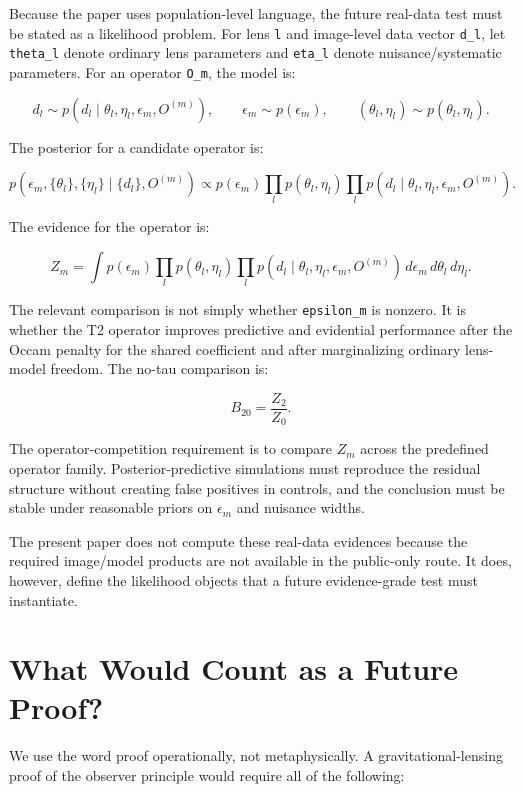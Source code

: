 \documentclass[11pt]{article}
\begin{document}
Because the paper uses population-level language, the future real-data
test must be stated as a likelihood problem. For lens \texttt{l} and
image-level data vector \texttt{d\_l}, let \texttt{theta\_l} denote
ordinary lens parameters and \texttt{eta\_l} denote nuisance/systematic
parameters. For an operator \texttt{O\_m}, the model is:

\[
d_l \sim
p\!\left(d_l \mid \theta_l,\eta_l,\epsilon_m,O^{(m)}\right),
\qquad
\epsilon_m \sim p(\epsilon_m),
\qquad
(\theta_l,\eta_l) \sim p(\theta_l,\eta_l).
\]

The posterior for a candidate operator is:

\[
p\!\left(
\epsilon_m,\{\theta_l\},\{\eta_l\}
\mid
\{d_l\},O^{(m)}
\right)
\propto
p(\epsilon_m)
\prod_l p(\theta_l,\eta_l)
\prod_l
p\!\left(d_l\mid\theta_l,\eta_l,\epsilon_m,O^{(m)}\right).
\]

The evidence for the operator is:

\[
Z_m =
\int
p(\epsilon_m)
\prod_l p(\theta_l,\eta_l)
\prod_l p\!\left(d_l\mid\theta_l,\eta_l,\epsilon_m,O^{(m)}\right)
\,d\epsilon_m\,d\theta_l\,d\eta_l.
\]

The relevant comparison is not simply whether \texttt{epsilon\_m} is
nonzero. It is whether the T2 operator improves predictive and
evidential performance after the Occam penalty for the shared
coefficient and after marginalizing ordinary lens-model freedom. The
no-tau comparison is:

\[
B_{20} = \frac{Z_2}{Z_0}.
\]

The operator-competition requirement is to compare \(Z_m\) across the
predefined operator family. Posterior-predictive simulations must
reproduce the residual structure without creating false positives in
controls, and the conclusion must be stable under reasonable priors on
\(\epsilon_m\) and nuisance widths.

The present paper does not compute these real-data evidences because the
required image/model products are not available in the public-only
route. It does, however, define the likelihood objects that a future
evidence-grade test must instantiate.

\section{What Would Count as a Future
Proof?}\label{what-would-count-as-a-future-proof}

We use the word proof operationally, not metaphysically. A
gravitational-lensing proof of the observer principle would require all
of the following:
\end{document}

